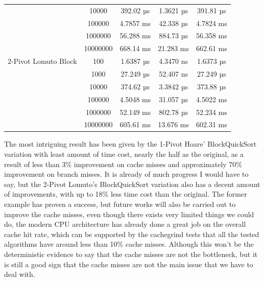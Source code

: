 \documentclass{article}
\begin{document}
\begin{center}
\begin{tabular}{ |c c | c c c| }
                        & 10000    & 392.02 µs    & 1.3621 µs   & 391.81 µs \\
                        & 100000   & 4.7857 ms    & 42.338 µs   & 4.7824 ms \\
                        & 1000000  & 56.288 ms    & 884.73 µs   & 56.358 ms \\
                        & 10000000 & 668.14 ms    & 21.283 ms   & 662.61 ms \\
   2-Pivot Lomuto Block & 100      & 1.6387 µs    & 4.3470 ns   & 1.6373 µs \\
                        & 1000     & 27.249 µs    & 52.407 ns   & 27.249 µs \\
                        & 10000    & 374.62 µs    & 3.3842 µs   & 373.88 µs \\
                        & 100000   & 4.5048 ms    & 31.057 µs   & 4.5022 ms \\
                        & 1000000  & 52.149 ms    & 802.78 µs   & 52.234 ms \\
                        & 10000000 & 605.61 ms    & 13.676 ms   & 602.31 ms \\
        \hline
    \end{tabular}
\end{center}

The most intriguing result has been given by the 1-Pivot Hoare' BlockQuickSort variation with least amount of time cost, nearly the half as the original, as a result of less than 3\% improvement on cache misses and approximately 70\% improvement on branch misses.
It is already of much progress I would have to say, but the 2-Pivot Lomuto's BlockQuickSort variation also has a decent amount of improvements, with up to 18\% less time cost than the original.
The former example has proven a success, but future works will also be carried out to improve the cache misses, even though there exists very limited things we could do,
the modern CPU architecture has already done a great job on the overall cache hit rate, which can be supported by the cachegrind tests that all the tested algorithms have around less than 10\% cache misses.
Although this won't be the deterministic evidence to say that the cache misses are not the bottleneck, but it is still a good sign that the cache misses are not the main issue that we have to deal with.


\end{document}
